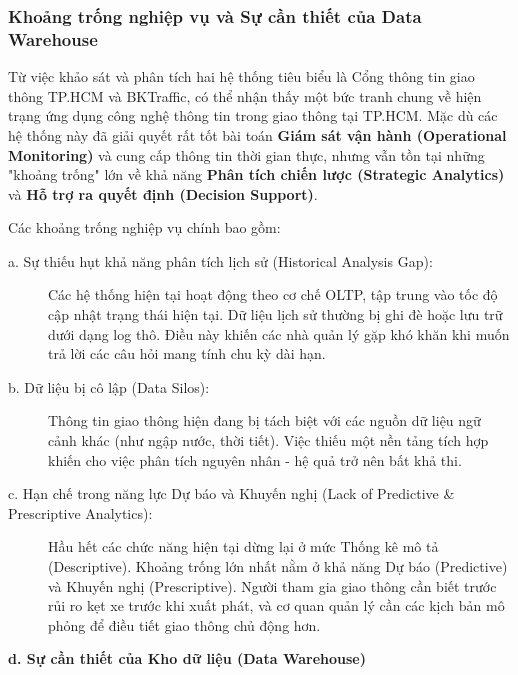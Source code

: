 \subsubsection{Khoảng trống nghiệp vụ và Sự cần thiết của Data Warehouse}

Từ việc khảo sát và phân tích hai hệ thống tiêu biểu là Cổng thông tin giao thông TP.HCM và BKTraffic, có thể nhận thấy một bức tranh chung về hiện trạng ứng dụng công nghệ thông tin trong giao thông tại TP.HCM. Mặc dù các hệ thống này đã giải quyết rất tốt bài toán \textbf{Giám sát vận hành (Operational Monitoring)} và cung cấp thông tin thời gian thực, nhưng vẫn tồn tại những "khoảng trống" lớn về khả năng \textbf{Phân tích chiến lược (Strategic Analytics)} và \textbf{Hỗ trợ ra quyết định (Decision Support)}.

Các khoảng trống nghiệp vụ chính bao gồm:

\begin{description}
    \item[a. Sự thiếu hụt khả năng phân tích lịch sử (Historical Analysis Gap):] Các hệ thống hiện tại hoạt động theo cơ chế OLTP, tập trung vào tốc độ cập nhật trạng thái hiện tại. Dữ liệu lịch sử thường bị ghi đè hoặc lưu trữ dưới dạng log thô. Điều này khiến các nhà quản lý gặp khó khăn khi muốn trả lời các câu hỏi mang tính chu kỳ dài hạn.

    \item[b. Dữ liệu bị cô lập (Data Silos):] Thông tin giao thông hiện đang bị tách biệt với các nguồn dữ liệu ngữ cảnh khác (như ngập nước, thời tiết). Việc thiếu một nền tảng tích hợp khiến cho việc phân tích nguyên nhân - hệ quả trở nên bất khả thi.

    \item[c. Hạn chế trong năng lực Dự báo và Khuyến nghị (Lack of Predictive \& Prescriptive Analytics):] Hầu hết các chức năng hiện tại dừng lại ở mức Thống kê mô tả (Descriptive). Khoảng trống lớn nhất nằm ở khả năng Dự báo (Predictive) và Khuyến nghị (Prescriptive). Người tham gia giao thông cần biết trước rủi ro kẹt xe trước khi xuất phát, và cơ quan quản lý cần các kịch bản mô phỏng để điều tiết giao thông chủ động hơn.
\end{description}

\textbf{d. Sự cần thiết của Kho dữ liệu (Data Warehouse)}\\

